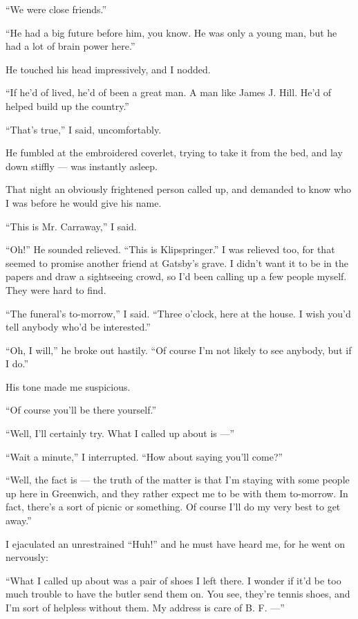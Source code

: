 \documentclass{znotebook}
\begin{document}
``We were close friends.''

``He had a big future before him, you know. He was only a young man, but he had a lot of brain power here.''

He touched his head impressively, and I nodded.

``If he'd of lived, he'd of been a great man. A man like James J. Hill. He'd of helped build up the country.''

``That's true,'' I said, uncomfortably.

He fumbled at the embroidered coverlet, trying to take it from the bed, and lay down stiffly ---{} was instantly asleep.

That night an obviously frightened person called up, and demanded to know who I was before he would give his name.

``This is Mr. Carraway,'' I said.

``Oh!'' He sounded relieved. ``This is Klipspringer.'' I was relieved too, for that seemed to promise another friend at Gatsby's grave. I didn't want it to be in the papers and draw a sightseeing crowd, so I'd been calling up a few people myself. They were hard to find.

``The funeral's to-morrow,'' I said. ``Three o'clock, here at the house. I wish you'd tell anybody who'd be interested.''

``Oh, I will,'' he broke out hastily. ``Of course I'm not likely to see anybody, but if I do.''

His tone made me suspicious.

``Of course you'll be there yourself.''

``Well, I'll certainly try. What I called up about is ---''

``Wait a minute,'' I interrupted. ``How about saying you'll come?''

``Well, the fact is ---{} the truth of the matter is that I'm staying with some people up here in Greenwich, and they rather expect me to be with them to-morrow. In fact, there's a sort of picnic or something. Of course I'll do my very best to get away.''

I ejaculated an unrestrained ``Huh!'' and he must have heard me, for he went on nervously:

``What I called up about was a pair of shoes I left there. I wonder if it'd be too much trouble to have the butler send them on. You see, they're tennis shoes, and I'm sort of helpless without them. My address is care of B. F. ---''
\end{document}

